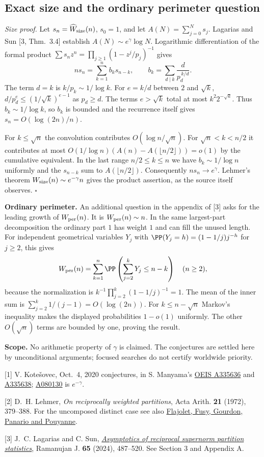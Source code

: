 \documentclass[11pt,a4paper]{article}
\numberwithin{equation}{section}
\theoremstyle{definition}
\theoremstyle{remark}
\begin{document}
\subsection*{Exact size and the ordinary perimeter question}
\textit{Size proof.} Let $s_n=\widehat W_{\rm size}(n)$, $s_0=1$, and let $A(N)=\sum_{j=0}^N s_j$. Lagarias and Sun [3, Thm.~3.4] establish $A(N)\sim e^\gamma\log N$. Logarithmic differentiation of the formal product $\sum s_n z^n=\prod_{j\ge1}(1-z^j/p_j)^{-1}$ gives
\[
 ns_n=\sum_{k=1}^n b_k s_{n-k},\qquad b_k=\sum_{d\mid k}\frac{d}{p_d^{\,k/d}}.
\]
The term $d=k$ is $k/p_k\sim1/\log k$. For $e=k/d$ between $2$ and $\sqrt k$, $d/p_d^e\le (1/\sqrt k)^{e-1}$ as $p_d\ge d$. The terms $e>\sqrt k$ total at most $k^2 2^{-\sqrt k}$. Thus $b_k\sim1/\log k$, so $b_k$ is bounded and the recurrence itself gives $s_n=O(\log(2n)/n)$.

For $k\le\sqrt n$ the convolution contributes $O(\log n/\sqrt n)$. For $\sqrt n<k<n/2$ it contributes at most
$O(1/\log n)\left(A(n)-A(\lfloor n/2\rfloor)\right)=o(1)$ by the cumulative equivalent. In the last range $n/2\le k\le n$ we have $b_k\sim1/\log n$ uniformly and the $s_{n-k}$ sum to $A(\lfloor n/2\rfloor)$. Consequently $n s_n\to e^\gamma$. Lehmer's theorem $W_{\rm size}(n)\sim e^{-\gamma}n$ gives the product assertion, as the source itself observes. $\square$

\textbf{Ordinary perimeter.} An additional question in the appendix of [3] asks for the leading growth of $W_{\rm per}(n)$. It is $W_{\rm per}(n)\sim n$. In the same largest-part decomposition the ordinary part $1$ has weight $1$ and can fill the unused length. For independent geometrical variables $Y_j$ with $\PP(Y_j=h)=(1-1/j)j^{-h}$ for $j\ge2$, this gives
\[
 W_{\rm per}(n)=\sum_{k=1}^n\PP\left(\sum_{j=2}^{k}Y_j\le n-k\right)\quad(n\ge2),
\]
because the normalization is $k^{-1}\prod_{j=2}^k(1-1/j)^{-1}=1$. The mean of the inner sum is $\sum_{j=2}^k1/(j-1)=O(\log(2n))$. For $k\le n-\sqrt n$ Markov's inequality makes the displayed probabilities $1-o(1)$ uniformly. The other $O(\sqrt n)$ terms are bounded by one, proving the result.

\textbf{Scope.} No arithmetic property of $\gamma$ is claimed. The conjectures are settled here by unconditional arguments; focused searches do not certify worldwide priority.

{\small\raggedright
[1] V. Kote\v{s}ovec, Oct.\ 4, 2020 conjectures, in S. Manyama's
\href{https://oeis.org/A335636}{OEIS A335636} and \href{https://oeis.org/A335638}{A335638}; \href{https://oeis.org/A080130}{A080130} is $e^{-\gamma}$.

[2] D.~H. Lehmer, \emph{On reciprocally weighted partitions}, Acta Arith. \textbf{21} (1972), 379--388. For the uncomposed distinct case see also \href{https://arxiv.org/abs/math/0606370}{Flajolet, Fusy, Gourdon, Panario and Pouyanne}.

[3] J.~C. Lagarias and C. Sun, \href{https://doi.org/10.1007/s11139-024-00893-8}{\emph{Asymptotics of reciprocal supernorm partition statistics}}, Ramanujan J. \textbf{65} (2024), 487--520. See Section 3 and Appendix A.\par}
\end{document}
